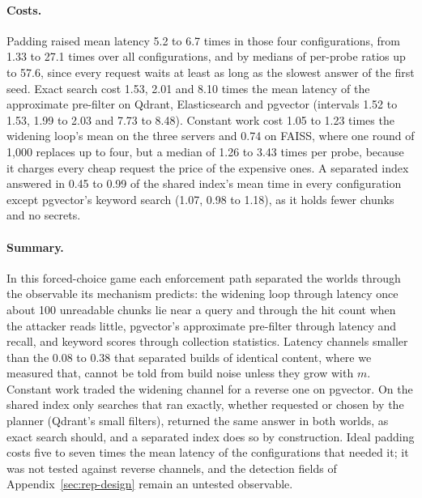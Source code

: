 \paragraph{Costs.}
Padding raised mean latency 5.2 to 6.7 times in those four configurations, from 1.33 to 27.1 times
over all configurations, and by medians of per-probe ratios up to 57.6, since every request waits at
least as long as the slowest answer of the first seed. Exact search cost 1.53, 2.01 and 8.10 times the mean latency of
the approximate pre-filter on Qdrant, Elasticsearch and pgvector (intervals 1.52 to 1.53, 1.99 to 2.03
and 7.73 to 8.48). Constant work cost 1.05 to 1.23 times the widening loop's mean on the three servers
and 0.74 on FAISS, where one round of 1,000 replaces up to four, but a median of 1.26 to 3.43 times
per probe, because it charges every cheap request the price of the expensive ones. A separated index
answered in 0.45 to 0.99 of the shared index's mean time in every configuration except pgvector's
keyword search (1.07, 0.98 to 1.18), as it holds fewer chunks and no secrets.

\paragraph{Summary.}
In this forced-choice game each enforcement path separated the worlds through the observable its
mechanism predicts: the widening loop through
latency once about 100 unreadable chunks lie near a query and through the hit count when the attacker
reads little, pgvector's approximate pre-filter through latency and recall, and keyword scores through
collection statistics. Latency channels smaller than the 0.08 to 0.38 that separated builds of
identical content, where we measured that, cannot be told from build noise unless they grow with $m$.
Constant work traded the widening channel for a reverse one on pgvector. On the shared index only
searches that ran exactly, whether requested or chosen by the planner (Qdrant's small filters), returned the same answer in both worlds, as exact search should, and a separated index does so by construction. Ideal padding costs five to seven times the mean latency of
the configurations that needed it; it was not tested against reverse channels, and the detection
fields of Appendix~\ref{sec:rep-design} remain an untested observable.
